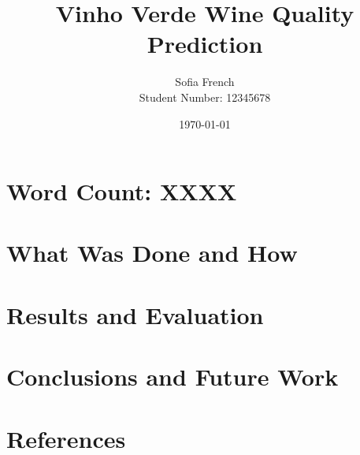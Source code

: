\documentclass[12pt]{article}
\title{Vinho Verde Wine Quality Prediction}
\author{Sofia French \\
Student Number: 12345678}
\date{\today}
\begin{document}
\maketitle

\section*{Word Count: XXXX}

\begin{abstract}
\end{abstract}

\section{What Was Done and How}

\section{Results and Evaluation}

\section{Conclusions and Future Work}

\section{References}
\end{document}
